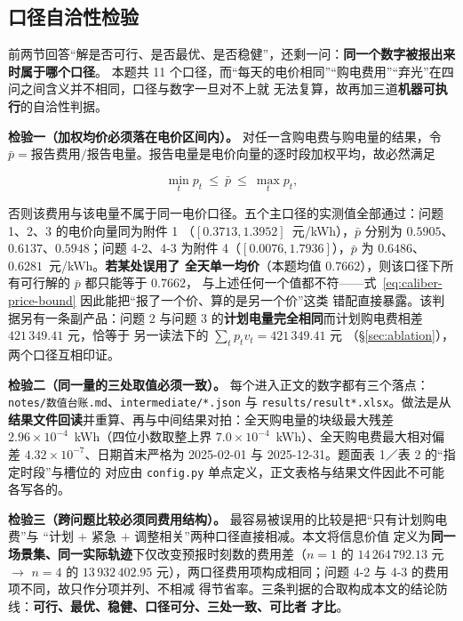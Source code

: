 \subsection{口径自洽性检验}\label{sec:caliber-check}

前两节回答“解是否可行、是否最优、是否稳健”，还剩一问：\textbf{同一个数字被报出来时属于哪个口径}。
本题共 11 个口径，而“每天的电价相同”“购电费用”“弃光”在四问之间含义并不相同，口径与数字一旦对不上就
无法复算，故再加三道\textbf{机器可执行}的自洽性判据。

\textbf{检验一（加权均价必须落在电价区间内）。} 对任一含购电费与购电量的结果，令
\(\bar p=\text{报告费用}/\text{报告电量}\)。报告电量是电价向量的逐时段加权平均，故必然满足

\begin{equation}
  \min_t p_t\ \le\ \bar p\ \le\ \max_t p_t ,
  \label{eq:caliber-price-bound}
\end{equation}

否则该费用与该电量不属于同一电价口径。五个主口径的实测值全部通过：问题 1、2、3 的电价向量同为附件 1
（\([0.3713,1.3952]\)~元/kWh），\(\bar p\) 分别为 \(0.5905\)、\(0.6137\)、\(0.5948\)；问题 4-2、4-3
为附件 4（\([0.0076,1.7936]\)），\(\bar p\) 为 \(0.6486\)、\(0.6281\)~元/kWh。\textbf{若某处误用了
全天单一均价}（本题均值 \(0.7662\)），则该口径下所有可行解的 \(\bar p\) 都只能等于 \(0.7662\)，
与上述任何一个值都不符——式~\eqref{eq:caliber-price-bound} 因此能把“报了一个价、算的是另一个价”这类
错配直接暴露。该判据另有一条副产品：问题 2 与问题 3 的\textbf{计划电量完全相同}而计划购电费相差
\(421\,349.41\) 元，恰等于  另一读法下的 \(\sum_tp_tv_t=421\,349.41\) 元
（\S\ref{sec:ablation}），两个口径互相印证。

\textbf{检验二（同一量的三处取值必须一致）。} 每个进入正文的数字都有三个落点：
\texttt{notes/数值台账.md}、\texttt{intermediate/*.json} 与 \texttt{results/result*.xlsx}。做法是从
\textbf{结果文件回读}并重算、再与中间结果对拍：全天购电量的块级最大残差
\(2.96\times10^{-4}\)~kWh（四位小数取整上界 \(7.0\times10^{-4}\)~kWh）、全天购电费最大相对偏差
\(4.32\times10^{-7}\)、日期首末严格为 2025-02-01 与 2025-12-31。题面表 1／表 2 的“指定时段”与槽位的
对应由 \texttt{config.py} 单点定义，正文表格与结果文件因此不可能各写各的。

\textbf{检验三（跨问题比较必须同费用结构）。} 最容易被误用的比较是把“只有计划购电费”与
“计划 \(+\) 紧急 \(+\) 调整相关”两种口径直接相减。本文将信息价值  定义为\textbf{同一
场景集、同一实际轨迹}下仅改变预报时刻数的费用差（\(n=1\) 的 \(14\,264\,792.13\) 元 \(\to\) \(n=4\) 的
\(13\,932\,402.95\) 元），两口径费用项构成相同；问题 4-2 与 4-3 的费用项不同，故只作分项并列、不相减
得节省率。三条判据的合取构成本文的结论防线：\textbf{可行、最优、稳健、口径可分、三处一致、可比者
才比}。
